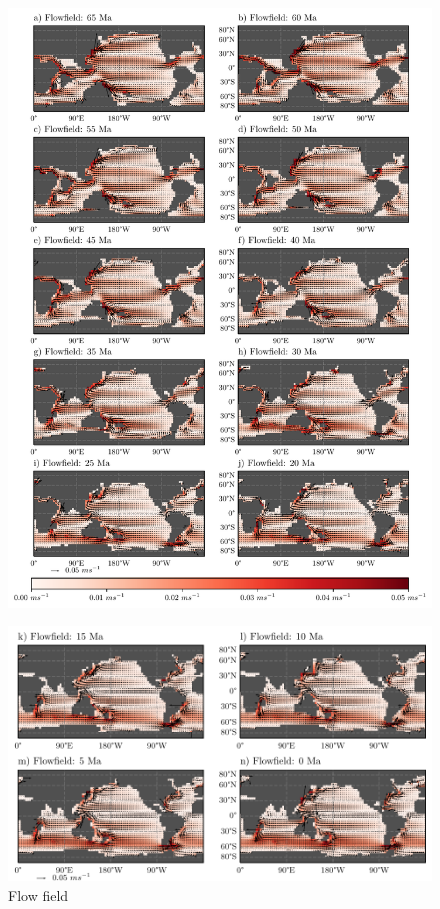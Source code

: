 \documentclass[a4paper]{article}
\begin{document}
\begin{figure}[H]
\includegraphics[width=\linewidth]{flowfield_1.pdf}
\end{figure}
\begin{figure}[H]
\includegraphics[width=\linewidth]{flowfield_2.pdf}
\caption{Flow field}
\label{fig:flowfield}
\end{figure}
\end{document}
